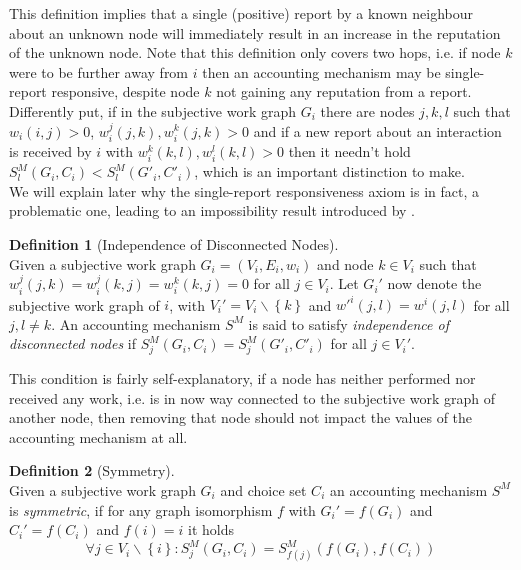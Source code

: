 \documentclass[11pt,a4paper]{article}
\theoremstyle{definition}
\newtheorem{definition}{Definition}[section]
\theoremstyle{theorem}
\theoremstyle{proposition}
\theoremstyle{corollary}
\theoremstyle{lemma}
\theoremstyle{example}
\theoremstyle{remark}
\begin{document}
\noindent{}This definition implies that a single (positive) report by a known neighbour about an unknown node will immediately result in an increase in the reputation of the unknown node. Note that this definition only covers two hops, i.e. if node $k$ were to be further away from $i$ then an accounting mechanism may be single-report responsive, despite node $k$ not gaining any reputation from a report. Differently put, if in the subjective work graph $G_i$ there are nodes $j,k,l$ such that $w_i(i,j)>0$, $w_i^j(j,k),w_i^k(j,k)>0$ and if a new report about an interaction is received by $i$ with $w_i^k(k,l),w_i^l(k,l)>0$ then it needn't hold $S^M_l(G_i,C_i) < S^M_l(G'_i,C'_i)$, which is an important distinction to make. \vspace{1em}\\

\noindent{}We will explain later why the single-report responsiveness axiom is in fact, a problematic one, leading to an impossibility result introduced by \cite{On the Sybil-Proofness of Accounting Mechanisms}. 

\begin{definition}[Independence of Disconnected Nodes]\ \\
Given a subjective work graph $G_i=(V_i,E_i,w_i)$ and node $k\in{}V_i$ such that $w_i^j(j,k)=w_i^j(k,j)=w_i^k(k,j)=0$ for all $j\in{}V_i$. Let $G_i'$ now denote the subjective work graph of $i$, with $V_i'=V_i\backslash{}\left\lbrace{}k\right\rbrace$ and $w'^i(j,l)=w^i(j,l)$ for all $j,l\neq{}k$. An accounting mechanism $S^M$ is said to satisfy {\it independence of disconnected nodes} if $S^M_j(G_i,C_i)=S^M_j(G'_i,C'_i)$ for all $j\in{}V_i'$.  
\end{definition}

\noindent{}This condition is fairly self-explanatory, if a node has neither performed nor received any work, i.e. is in now way connected to the subjective work graph of another node, then removing that node should not impact the values of the accounting mechanism at all. 

\begin{definition}[Symmetry]\ \\
Given a subjective work graph $G_i$ and choice set $C_i$ an accounting mechanism $S^M$ is {\it symmetric}, if for any graph isomorphism $f$
with $G_i'=f(G_i)$ and $C_i'=f(C_i)$ and $f(i)=i$ it holds
\[
\forall{}j\in{}V_i\backslash\left\lbrace{}i\right\rbrace: S^M_j(G_i,C_i)=S^M_{f(j)}(f(G_i),f(C_i))
\]
\end{definition}
\end{document}
